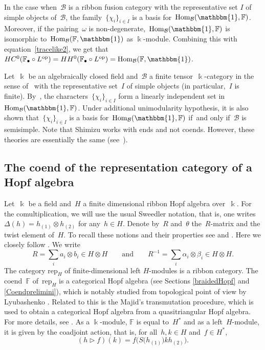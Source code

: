 \documentclass[pdftex]{sigma}
\numberwithin{equation}{section}
\newcommand{\tens}{\otimes}
\newcommand{\mc}{\mathcal}
\newcommand{\opp}{\mathrm{op}}
\newcommand{\Hom}{\mathrm{Hom}}
\newcommand{\kk}{\Bbbk}
\newcommand{\uu}{\mathbbm{1}}
\newcommand{\coend}{\mathbb{F}}
\newcommand{\rep}[1]{\text{rep}_{#1}}
\newcommand{\rtrn}{\triangleright}
\begin{document}
In the case when~$\mc B$ is a ribbon fusion category with the representative set $I$ of simple objects of~$\mc B$, the family~$\{\chi_i\}_{i\in I}$ is a basis for~$\Hom_{\mc B}(\uu,\coend)$.
Moreover, if the pairing~$\omega$ is non-degenerate,~$\Hom_{\mc B}(\uu,\coend)$ is isomorphic to~$\Hom_{\mc B}(\coend, \uu)$ as $\kk$-module. Combining this with equation~\eqref{tracelike2}, we get that $ HC^0(\coend_\bullet\circ L^\opp) = HH^0(\coend_\bullet\circ L^\opp) = \Hom_{\mc B}(\coend, \uu)$.

\begin{Remark}
Let~$\kk$ be an algebraically closed field and~$\mc B$ a finite tensor~$\kk$-category in the sense of~\cite{etingof-ostrik} with the representative set~$I$ of simple objects (in particular,~$I$ is finite). By~\cite[Theorem~4.1]{shimizu}, the characters~$\{\chi_i\}_{i\in I}$ form a linearly independent set in~$\Hom_{\mc B}(\uu, \coend)$. Under additional unimodularity hypothesis, it is also shown that~$\{\chi_i\}_{i\in I}$ is a basis for~$\Hom_{\mc B}(\uu, \coend)$ if~and only if~$\mc B$ is semisimple. Note that Shimizu works with ends and not coends. However, these theories are essentially the same (see~\cite[Remark 3.12]{shimizu}).
\end{Remark}

\subsection{The coend of the re\-pre\-senta\-tion ca\-te\-go\-ry of a Hopf al\-ge\-bra} \label{hopfexplicit}

Let~$\kk$ be a field and~$H$ a finite dimensional ribbon Hopf algebra over~$\kk$. For the comultiplication, we will use the usual Sweedler notation, that is, one writes~$\Delta(h)= h_{(1)}\tens h_{(2)}$ for any~$h\in H$. Denote by~$R$ and~$\theta$ the~$R$-matrix and the twist element of~$H$. To recall these notions and their properties see \cite{drinfeld1989almost} and \cite{reshetikhin1990ribbon}.
Here we closely follow \cite[Sections 4.2--4.6]{virelizier_2006}. We write
\[
R=\sum_i a_i \tens b_i \in H\tens H \qquad \text{and}\qquad R^{-1}=\sum_i \alpha_i\tens \beta_i \in H\tens H.
 \]
The category $\rep{H}$ of finite-dimensional left $H$-modules is a ribbon category. The coend~$\coend$ of~$\rep{H}$ is a categorical Hopf algebra (see Sections \ref{braidedHopf} and \ref{Coendprelimini}), which is notably studied from topological point of view by Lyubashenko \cite{lyubashenko1995invariants, lyubashenko1995tangles}. Related to this is the Majid's transmutation procedure, which is used to obtain a categorical Hopf algebra from a quasitriangular Hopf algebra. For more details, see \cite{majid1994algebras, majid2000foundations}.
As a $\kk$-module, $\coend$ is equal to~$H^*$ and as a left~$H$-module, it is given by the coadjoint action, that is, for all~$h,k\in H$ and~$f\in H^*$,
\[(h\rtrn f)(k)=f\bigl(S\bigl(h_{(1)}\bigr) k h_{(2)}\bigr).\]
\end{document}
